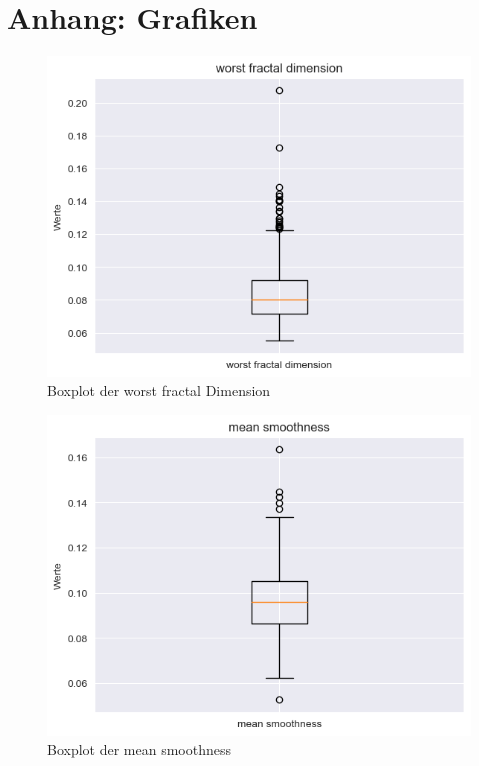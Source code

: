 \documentclass[a4paper,12pt]{article}
\begin{document}
\section{Anhang: Grafiken}
\begin{figure}[H]
    \centering
    \includegraphics[width=\textwidth]{boxplot1.png}
    \caption{Boxplot der worst fractal Dimension}
    \label{fig:boxplot1}
\end{figure}
\begin{figure}[H]
    \centering
    \includegraphics[width=\textwidth]{boxplot2.png}
    \caption{Boxplot der mean smoothness}
    \label{fig:boxplot2}
\end{figure}
\end{document}
